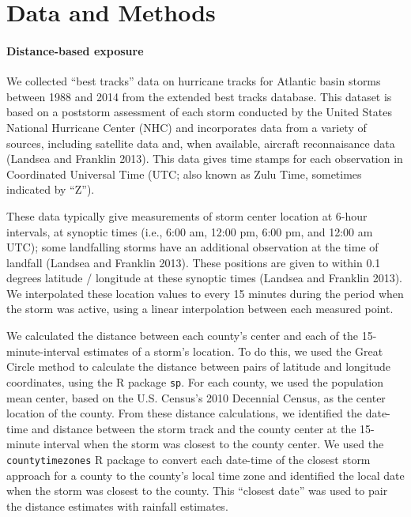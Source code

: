 \documentclass[]{elsarticle} %
\begin{document}
\section{Data and Methods}\label{data-and-methods}

\paragraph{Distance-based exposure}\label{distance-based-exposure}

We collected ``best tracks'' data on hurricane tracks for Atlantic basin
storms between 1988 and 2014 from the extended best tracks database.
This dataset is based on a poststorm assessment of each storm conducted
by the United States National Hurricane Center (NHC) and incorporates
data from a variety of sources, including satellite data and, when
available, aircraft reconnaisance data (Landsea and Franklin 2013). This
data gives time stamps for each observation in Coordinated Universal
Time (UTC; also known as Zulu Time, sometimes indicated by ``Z'').

These data typically give measurements of storm center location at
6-hour intervals, at synoptic times (i.e., 6:00 am, 12:00 pm, 6:00 pm,
and 12:00 am UTC); some landfalling storms have an additional
observation at the time of landfall (Landsea and Franklin 2013). These
positions are given to within 0.1 degrees latitude / longitude at these
synoptic times (Landsea and Franklin 2013). We interpolated these
location values to every 15 minutes during the period when the storm was
active, using a linear interpolation between each measured point.

We calculated the distance between each county's center and each of the
15-minute-interval estimates of a storm's location. To do this, we used
the Great Circle method to calculate the distance between pairs of
latitude and longitude coordinates, using the R package \texttt{sp}. For
each county, we used the population mean center, based on the U.S.
Census's 2010 Decennial Census, as the center location of the county.
From these distance calculations, we identified the date-time and
distance between the storm track and the county center at the 15-minute
interval when the storm was closest to the county center. We used the
\texttt{countytimezones} R package to convert each date-time of the
closest storm approach for a county to the county's local time zone and
identified the local date when the storm was closest to the county. This
``closest date'' was used to pair the distance estimates with rainfall
estimates.
\end{document}
